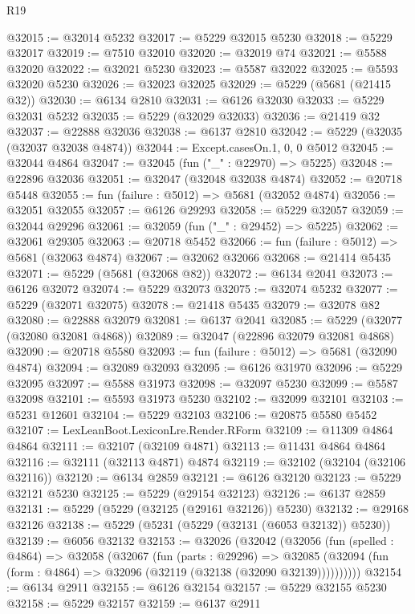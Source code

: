 \begin{lexlean}{R19}
\begin{coremodule}
@32015 := @32014 @5232
@32017 := @5229 @32015 @5230
@32018 := @5229 @32017
@32019 := @7510 @32010
@32020 := @32019 @74
@32021 := @5588 @32020
@32022 := @32021 @5230
@32023 := @5587 @32022
@32025 := @5593 @32020 @5230
@32026 := @32023 @32025
@32029 := @5229 (@5681 (@21415 @32))
@32030 := @6134 @2810
@32031 := @6126 @32030
@32033 := @5229 @32031 @5232
@32035 := @5229 (@32029 @32033)
@32036 := @21419 @32
@32037 := @22888 @32036
@32038 := @6137 @2810
@32042 := @5229 (@32035 (@32037 @32038 @4874))
@32044 := Except.casesOn.{1, 0, 0} @5012
@32045 := @32044 @4864
@32047 := @32045 (fun ("_" : @22970) => @5225)
@32048 := @22896 @32036
@32051 := @32047 (@32048 @32038 @4874)
@32052 := @20718 @5448
@32055 := fun (failure : @5012) => @5681 (@32052 @4874)
@32056 := @32051 @32055
@32057 := @6126 @29293
@32058 := @5229 @32057
@32059 := @32044 @29296
@32061 := @32059 (fun ("_" : @29452) => @5225)
@32062 := @32061 @29305
@32063 := @20718 @5452
@32066 := fun (failure : @5012) => @5681 (@32063 @4874)
@32067 := @32062 @32066
@32068 := @21414 @5435
@32071 := @5229 (@5681 (@32068 @82))
@32072 := @6134 @2041
@32073 := @6126 @32072
@32074 := @5229 @32073
@32075 := @32074 @5232
@32077 := @5229 (@32071 @32075)
@32078 := @21418 @5435
@32079 := @32078 @82
@32080 := @22888 @32079
@32081 := @6137 @2041
@32085 := @5229 (@32077 (@32080 @32081 @4868))
@32089 := @32047 (@22896 @32079 @32081 @4868)
@32090 := @20718 @5580
@32093 := fun (failure : @5012) => @5681 (@32090 @4874)
@32094 := @32089 @32093
@32095 := @6126 @31970
@32096 := @5229 @32095
@32097 := @5588 @31973
@32098 := @32097 @5230
@32099 := @5587 @32098
@32101 := @5593 @31973 @5230
@32102 := @32099 @32101
@32103 := @5231 @12601
@32104 := @5229 @32103
@32106 := @20875 @5580 @5452
@32107 := LexLeanBoot.LexiconLre.Render.RForm
@32109 := @11309 @4864 @4864
@32111 := @32107 (@32109 @4871)
@32113 := @11431 @4864 @4864
@32116 := @32111 (@32113 @4871) @4874
@32119 := @32102 (@32104 (@32106 @32116))
@32120 := @6134 @2859
@32121 := @6126 @32120
@32123 := @5229 @32121 @5230
@32125 := @5229 (@29154 @32123)
@32126 := @6137 @2859
@32131 := @5229 (@5229 (@32125 (@29161 @32126)) @5230)
@32132 := @29168 @32126
@32138 := @5229 (@5231 (@5229 (@32131 (@6053 @32132)) @5230))
@32139 := @6056 @32132
@32153 := @32026
    (@32042
      (@32056
        (fun (spelled : @4864) =>
        @32058
          (@32067
            (fun (parts : @29296) =>
            @32085 (@32094 (fun (form : @4864) => @32096 (@32119 (@32138 (@32090 @32139))))))))))
@32154 := @6134 @2911
@32155 := @6126 @32154
@32157 := @5229 @32155 @5230
@32158 := @5229 @32157
@32159 := @6137 @2911

\end{coremodule}
\end{lexlean}
